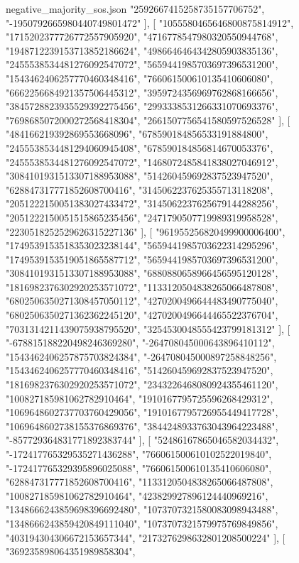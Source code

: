 \begin{filecontents*}[overwrite]{negative_majority_sos.json}
    "2592667415258735157706752",
    "-1950792665980440749801472"
   ],
   [
    "1055580465646800875814912",
    "1715202377726772557905920",
    "4716778547980320550944768",
    "1948712239153713852186624",
    "4986646464342805903835136",
    "2455538534481276092547072",
    "5659441985703697396531200",
    "1543462406257770460348416",
    "766061500610135410606080",
    "6662256684921357506445312",
    "3959724356969762868166656",
    "3845728823935529392275456",
    "2993338531266331070693376",
    "7698685072000272568418304",
    "2661507756541580597526528"
   ],
   [
    "484166219392869553668096",
    "678590184856533191884800",
    "2455538534481294060945408",
    "678590184856814670053376",
    "2455538534481276092547072",
    "1468072485841838027046912",
    "3084101931513307188953088",
    "514260459692837523947520",
    "628847317771852608700416",
    "3145062237625355713118208",
    "2051222150051383027433472",
    "3145062237625679144288256",
    "2051222150051515865235456",
    "2471790507719989319958528",
    "2230518252529626315227136"
   ],
   [
    "961955256820499900006400",
    "1749539153518353023238144",
    "5659441985703622314295296",
    "1749539153519051865587712",
    "5659441985703697396531200",
    "3084101931513307188953088",
    "6880880658966456595120128",
    "1816982376302920253571072",
    "1133120504838265066487808",
    "6802506350271308457050112",
    "4270200496644483490775040",
    "6802506350271362362245120",
    "4270200496644465522376704",
    "7031314211439075938795520",
    "3254530048555423799181312"
   ],
   [
    "-678815188220498246369280",
    "-264708045000643896410112",
    "1543462406257875703824384",
    "-264708045000897258848256",
    "1543462406257770460348416",
    "514260459692837523947520",
    "1816982376302920253571072",
    "2343226468080924355461120",
    "100827185981062782910464",
    "1910167795725596268429312",
    "1069648602737703760429056",
    "1910167795726955449417728",
    "1069648602738155376869376",
    "3844248933763043964223488",
    "-857729364831771892383744"
   ],
   [
    "52486167865046582034432",
    "-172417765329535271436288",
    "766061500610102522019840",
    "-172417765329395896025088",
    "766061500610135410606080",
    "628847317771852608700416",
    "1133120504838265066487808",
    "100827185981062782910464",
    "423829927896124440969216",
    "1348666243859698396692480",
    "1073707321580083098943488",
    "1348666243859420849111040",
    "1073707321579975769849856",
    "403194304306672153657344",
    "2173276298632801208500224"
   ],
   [
    "369235898064351989858304",

\end{filecontents*}
